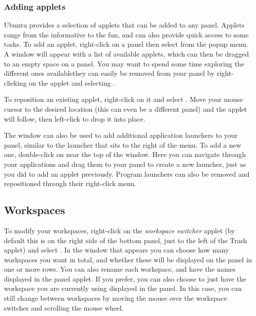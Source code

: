 \subsubsection{Adding applets}
Ubuntu provides a selection of applets that can be added to any panel. Applets range from the informative to the fun, and can also provide quick access to some tasks. To add an applet, right-click on a panel then select  from the popup menu. A window will appear with a list of available applets, which can then be dragged to an empty space on a panel. You may want to spend some time exploring the different ones available\dash they can easily be removed from your panel by right-clicking on the applet and selecting .


To reposition an existing applet, right-click on it and select . Move your mouse cursor to the desired location (this can even be a different panel) and the applet will follow, then left-click to drop it into place. 

The  window can also be used to add additional application launchers to your panel, similar to the  launcher that sits to the right of the  menu. To add a new one, double-click on  near the top of the window. Here you can navigate through your applications and drag them to your panel to create a new launcher, just as you did to add an applet previously. Program launchers can also be removed and repositioned through their right-click menu.

\subsection{Workspaces}
To modify your workspaces, right-click on the \emph{workspace switcher} applet (by default this is on the right side of the bottom panel, just to the left of the Trash applet) and select . In the window that appears you can choose how many workspaces you want in total, and whether these will be displayed on the panel in one or more rows. You can also rename each workspace, and have the names displayed in the panel applet. If you prefer, you can also choose to just have the workspace you are currently using displayed in the panel. In this case, you can still change between workspaces by moving the mouse over the workspace switcher and scrolling the mouse wheel.

